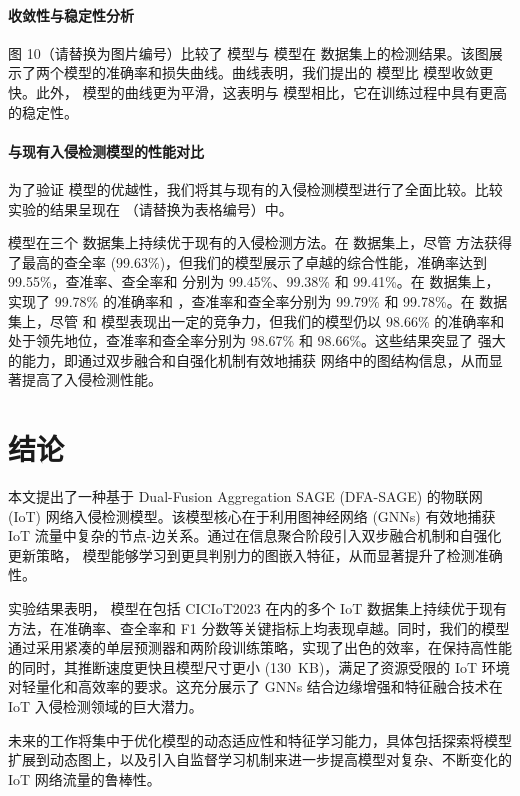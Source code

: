 \documentclass{article}
\begin{document}
\paragraph{收敛性与稳定性分析}

图 10（请替换为图片编号）比较了  模型与  模型在
 数据集上的检测结果。该图展示了两个模型的准确率和损失曲线。曲线表明，我们提出的
 模型比  模型收敛更快。此外，
模型的曲线更为平滑，这表明与  模型相比，它在训练过程中具有更高的稳定性。

\paragraph{与现有入侵检测模型的性能对比}

为了验证  模型的优越性，我们将其与现有的入侵检测模型进行了全面比较。比较实验的结果呈现在
（请替换为表格编号）中。

 模型在三个  数据集上持续优于现有的入侵检测方法。在
 数据集上，尽管  方法获得了最高的查全率
(99.63\%)，但我们的模型展示了卓越的综合性能，准确率达到 99.55\%，查准率、查全率和  分别为
99.45\%、99.38\% 和 99.41\%。在  数据集上， 实现了
99.78\% 的准确率和 ，查准率和查全率分别为 99.79\% 和 99.78\%。在
 数据集上，尽管  和 
模型表现出一定的竞争力，但我们的模型仍以 98.66\% 的准确率和  处于领先地位，查准率和查全率分别为
98.67\% 和 98.66\%。这些结果突显了  强大的能力，即通过双步融合和自强化机制有效地捕获
 网络中的图结构信息，从而显著提高了入侵检测性能。

\section{结论}
本文提出了一种基于 Dual-Fusion Aggregation SAGE (DFA-SAGE) 的物联网 (IoT)
网络入侵检测模型。该模型核心在于利用图神经网络 (GNNs) 有效地捕获 IoT
流量中复杂的节点-边关系。通过在信息聚合阶段引入双步融合机制和自强化更新策略，
模型能够学习到更具判别力的图嵌入特征，从而显著提升了检测准确性。

实验结果表明， 模型在包括 CICIoT2023 在内的多个 IoT
数据集上持续优于现有方法，在准确率、查全率和 F1
分数等关键指标上均表现卓越。同时，我们的模型通过采用紧凑的单层预测器和两阶段训练策略，实现了出色的效率，在保持高性能的同时，其推断速度更快且模型尺寸更小
(130 KB)，满足了资源受限的 IoT 环境对轻量化和高效率的要求。这充分展示了 GNNs 结合边缘增强和特征融合技术在 IoT 入侵检测领域的巨大潜力。

未来的工作将集中于优化模型的动态适应性和特征学习能力，具体包括探索将模型扩展到动态图上，以及引入自监督学习机制来进一步提高模型对复杂、不断变化的
IoT 网络流量的鲁棒性。

\end{document}
